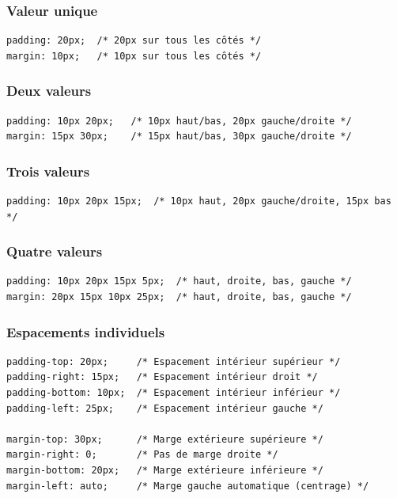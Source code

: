 \documentclass[12pt,a4paper]{article}
\begin{document}
\subsubsection{Valeur unique}

\begin{lstlisting}[style=CSS]
padding: 20px;  /* 20px sur tous les côtés */
margin: 10px;   /* 10px sur tous les côtés */
\end{lstlisting}

\subsubsection{Deux valeurs}

\begin{lstlisting}[style=CSS]
padding: 10px 20px;   /* 10px haut/bas, 20px gauche/droite */
margin: 15px 30px;    /* 15px haut/bas, 30px gauche/droite */
\end{lstlisting}

\subsubsection{Trois valeurs}

\begin{lstlisting}[style=CSS]
padding: 10px 20px 15px;  /* 10px haut, 20px gauche/droite, 15px bas */
\end{lstlisting}

\subsubsection{Quatre valeurs}

\begin{lstlisting}[style=CSS]
padding: 10px 20px 15px 5px;  /* haut, droite, bas, gauche */
margin: 20px 15px 10px 25px;  /* haut, droite, bas, gauche */
\end{lstlisting}

\subsubsection{Espacements individuels}

\begin{lstlisting}[style=CSS]
padding-top: 20px;     /* Espacement intérieur supérieur */
padding-right: 15px;   /* Espacement intérieur droit */
padding-bottom: 10px;  /* Espacement intérieur inférieur */
padding-left: 25px;    /* Espacement intérieur gauche */

margin-top: 30px;      /* Marge extérieure supérieure */
margin-right: 0;       /* Pas de marge droite */
margin-bottom: 20px;   /* Marge extérieure inférieure */
margin-left: auto;     /* Marge gauche automatique (centrage) */
\end{lstlisting}
\end{document}
